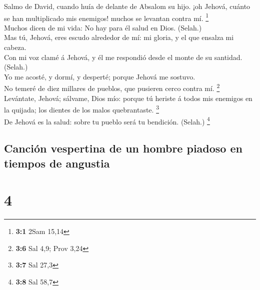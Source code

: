  Salmo de David, cuando huía de delante de Absalom su
hijo. ¡oh Jehová, cuánto se han multiplicado mis enemigos! muchos se
levantan contra mí. \footnote{\textbf{3:1} 2Sam 15,14}\\
 Muchos dicen de mi vida: No hay para él salud en Dios.
(Selah.)\\
 Mas tú, Jehová, eres escudo alrededor de mí: mi gloria, y
el que ensalza mi cabeza.\\
 Con mi voz clamé á Jehová, y él me respondió desde el
monte de su santidad. (Selah.)\\
 Yo me acosté, y dormí, y desperté; porque Jehová me
sostuvo.\\
 No temeré de diez millares de pueblos, que pusieren cerco
contra mí. \footnote{\textbf{3:6} Sal 4,9; Prov 3,24}\\
 Levántate, Jehová; sálvame, Dios mío: porque tú heriste á
todos mis enemigos en la quijada; los dientes de los malos quebrantaste.
\footnote{\textbf{3:7} Sal 27,3}\\
 De Jehová es la salud: sobre tu pueblo será tu bendición.
(Selah.) \footnote{\textbf{3:8} Sal 58,7}

\hypertarget{canciuxf3n-vespertina-de-un-hombre-piadoso-en-tiempos-de-angustia}{%
\subsection{Canción vespertina de un hombre piadoso en tiempos de
angustia}\label{canciuxf3n-vespertina-de-un-hombre-piadoso-en-tiempos-de-angustia}}

\hypertarget{section-3}{%
\section{4}\label{section-3}}


